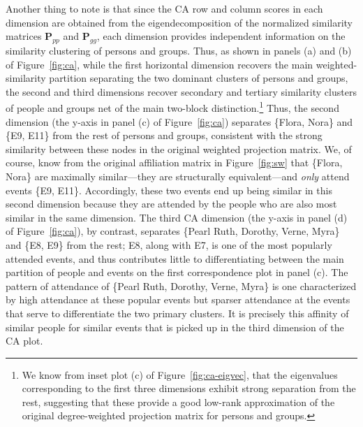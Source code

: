\documentclass[a4paper,fleqn]{cas-sc}
\begin{document}
\textit{}Another thing to note is that since the CA row and column scores in each dimension are obtained from the eigendecomposition of the normalized similarity matrices $\mathbf{P}_{pp}$ and $\mathbf{P}_{gg}$, each dimension provides independent information on the similarity clustering of persons and groups. Thus, as shown in panels (a) and (b) of Figure~\ref{fig:ca}, while the first horizontal dimension recovers the main weighted-similarity partition separating the two dominant clusters of persons and groups, the second and third dimensions recover secondary and tertiary similarity clusters of people and groups net of the main two-block distinction.\footnote{We know from inset plot (c) of Figure~\ref{fig:ca-eigvec}, that the eigenvalues corresponding to the first three dimensions exhibit strong separation from the rest, suggesting that these provide a good low-rank approximation of the original degree-weighted projection matrix for persons and groups.} Thus, the second dimension (the y-axis in panel (c) of Figure~\ref{fig:ca}) separates \{Flora, Nora\} and \{E9, E11\} from the rest of persons and groups, consistent with the strong similarity between these nodes in the original weighted projection matrix. We, of course, know from the original affiliation matrix in Figure~\ref{fig:sw} that \{Flora, Nora\} are maximally similar---they are structurally equivalent---and \textit{only} attend events \{E9, E11\}. Accordingly, these two events end up being similar in this second dimension because they are attended by the people who are also most similar in the same dimension. The third CA dimension (the y-axis in panel (d) of Figure~\ref{fig:ca}), by contrast, separates \{Pearl Ruth, Dorothy, Verne, Myra\} and \{E8, E9\} from the rest; E8, along with E7, is one of the most popularly attended events, and thus contributes little to differentiating between the main partition of people and events on the first correspondence plot in panel (c). The pattern of attendance of \{Pearl Ruth, Dorothy, Verne, Myra\} is one characterized by high attendance at these popular events but sparser attendance at the events that serve to differentiate the two primary clusters. It is precisely this affinity of similar people for similar events that is picked up in the third dimension of the CA plot. 
\end{document}
